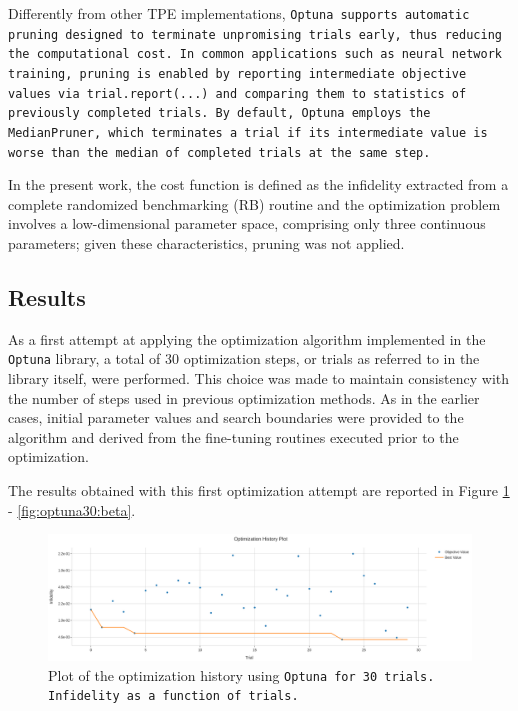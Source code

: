 Differently from other TPE implementations, \tt{Optuna} supports automatic pruning designed to terminate unpromising trials early, thus reducing the computational cost. 
In common applications such as neural network training, pruning is enabled by reporting intermediate objective values via \texttt{trial.report(...)} and comparing them to statistics of previously completed trials. 
By default, \texttt{Optuna} employs the \texttt{MedianPruner}, which terminates a trial if its intermediate value is worse than the median of completed trials at the same step.

In the present work, the cost function is defined as the infidelity extracted from a complete randomized benchmarking (RB) routine and the optimization problem involves a low-dimensional parameter space, comprising only three continuous parameters; given these characteristics, pruning was not applied.

\subsection{Results}

As a first attempt at applying the optimization algorithm implemented in the \texttt{Optuna} library, a total of 30 optimization steps, or trials as referred to in the library itself, were performed. 
This choice was made to maintain consistency with the number of steps used in previous optimization methods. 
As in the earlier cases, initial parameter values and search boundaries were provided to the algorithm and derived from the fine-tuning routines executed prior to the optimization.

The results obtained with this first optimization attempt are reported in Figure \ref{fig:optuna30:optimization} - \ref{fig:optuna30:beta}.

\begin{figure}[h!]
    \centering
    \includegraphics[width=\textwidth]{figures/png/RB_optimization/Optuna/30/optimization.png}
    \caption{Plot of the optimization history using \tt{Optuna} for 30 trials. Infidelity as a function of trials.}
    \label{fig:optuna30:optimization}
\end{figure}

